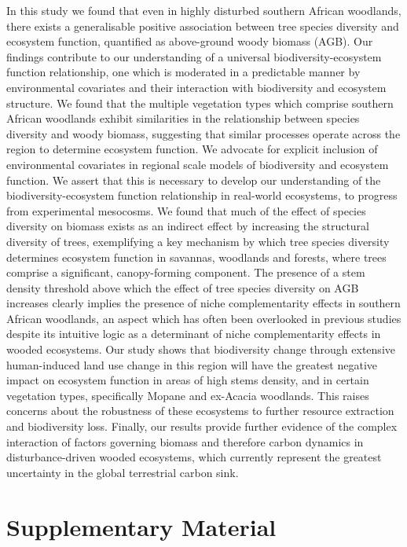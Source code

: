 \begin{refsection}
In this study we found that even in highly disturbed southern African woodlands, there exists a generalisable positive association between tree species diversity and ecosystem function, quantified as above-ground woody biomass (AGB). Our findings contribute to our understanding of a universal biodiversity-ecosystem function relationship, one which is moderated in a predictable manner by environmental covariates and their interaction with biodiversity and ecosystem structure. We found that the multiple vegetation types which comprise southern African woodlands exhibit similarities in the relationship between species diversity and woody biomass, suggesting that similar processes operate across the region to determine ecosystem function. We advocate for explicit inclusion of environmental covariates in regional scale models of biodiversity and ecosystem function. We assert that this is necessary to develop our understanding of the biodiversity-ecosystem function relationship in real-world ecosystems, to progress from experimental mesocosms. We found that much of the effect of species diversity on biomass exists as an indirect effect by increasing the structural diversity of trees, exemplifying a key mechanism by which tree species diversity determines ecosystem function in savannas, woodlands and forests, where trees comprise a significant, canopy-forming component. The presence of a stem density threshold above which the effect of tree species diversity on AGB increases clearly implies the presence of niche complementarity effects in southern African woodlands, an aspect which has often been overlooked in previous studies despite its intuitive logic as a determinant of niche complementarity effects in wooded ecosystems. Our study shows that biodiversity change through extensive human-induced land use change in this region will have the greatest negative impact on ecosystem function in areas of high stems density, and in certain vegetation types, specifically Mopane and ex-Acacia woodlands. This raises concerns about the robustness of these ecosystems to further resource extraction and biodiversity loss. Finally, our results provide further evidence of the complex interaction of factors governing biomass and therefore carbon dynamics in disturbance-driven wooded ecosystems, which currently represent the greatest uncertainty in the global terrestrial carbon sink.

\newpage{}
\FloatBarrier{}
\begingroup
{}
\printbibliography[heading=subbibintoc]
\endgroup

\section{Supplementary Material}
\label{befr:sec:supp}


\end{refsection}
